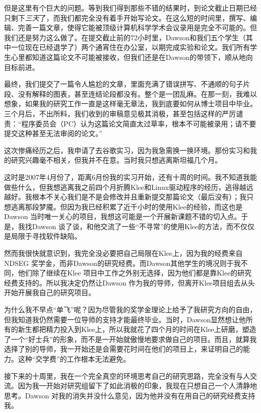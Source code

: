 \documentclass[letter,12pt]{book}
\begin{document}
\begin{CJK}{UTF8}{gbsn}
但是这里有个巨大的问题。等到我们得到那些不错的结果时，到论文截止日期已经只剩下\emph{三天}了，而我们都完全没有着手开始写论文。在这么短的时间里，撰写、编辑、完善一篇文章，使得它能被顶级计算机科学学术会议录用是完全不可能的。但我们还是努力这么做了。在提交截止前的72小时里，Dawson和我们五个学生（其中一位现在已经退学了）两个通宵住在办公室，以期完成实验和论文。我们所有学生心里都知道这篇论文不可能被接收，但我们还是在Dawson的带领下，顺从地向目标前进。

最终，我们提交了一篇令人尴尬的文章，里面充满了错误拼写、不通顺的句子片段、没有解释的图表，甚至连结论段都没有。整个是一团乱麻。在那一刻，我难以想象，如果我的研究工作一直是这样毫无章法，我到底要如何从博士项目中毕业。三个月后，不出所料，我们收到的审稿意见极其消极，甚至包括这样的严厉谴责：“程序委员会（PC）认为这篇论文简直太过草率，根本不可能被录用；请不要提交这种甚至无法审阅的论文。”

\breakline

这次惨痛经历之后，我申请了去谷歌实习，因为我急需换一换环境。那份实习和我的研究兴趣毫不相关，但我并不在意。当时我只想逃离斯坦福几个月。

这时是2007年4月份了，距离6月份我的实习开始，还有十周的时间。我不知道我能做些什么，但我想逃离我之前四个月折腾Klee和Linux驱动程序的经历，逃得越远越好。我根本不关心我们是不是会修改并且重新提交那篇论文（最后没有）；我只想逃离那段梦魇。但因为我已经积累了近千小时的使用Klee的经验，而这也是Dawson 当时唯一关心的项目，我想这可能是一个开展新课题不错的切入点。于是，我找Dawson 谈了谈，和他交流了一些“不寻常”的使用Klee的方法，而不仅仅是局限于寻找软件缺陷。

然而我很快就意识到，我完全没必要把自己局限在Klee上，因为我的经费来自NDSEG 奖学金，而非Dawson的研究经费。而Dawson其他学生的境况则于我不同，他们除了继续在Klee 项目中工作之外别无选择，因为他们都是靠Klee的研究经费支持的。所以我决定仍然让Dawson 作为我的导师，但离开Klee项目组去从头开始开展我自己的研究项目。

为什么我不早点“单飞”呢？因为尽管我的奖学金理论上给予了我研究方向的自由，但我知道我仍然需要一位导师的支持才能最终毕业。当时，Dawson显然想让他所有的新生都把精力投入到Klee上，所以我就花了四个月的时间在Klee上研磨，塑造了一个“好士兵”的形象，而不是一开始就傲慢地要求做自己的项目。而且，就算我选择了别的导师，我一开始还是会需要花时间在他们的项目上，来证明自己的能力。这种“交学费”的工作根本无法避免。

接下来的十周里，我在一个完全真空的环境思考自己的研究思路，完全没有与人交流。因为我一开始对研究组留下了如此消极的印象，我现在只想自己一个人清静地思考。Dawson 对我的消失并没什么意见，因为他并没有在用自己的研究经费支持我。


\end{CJK}
\end{document}

